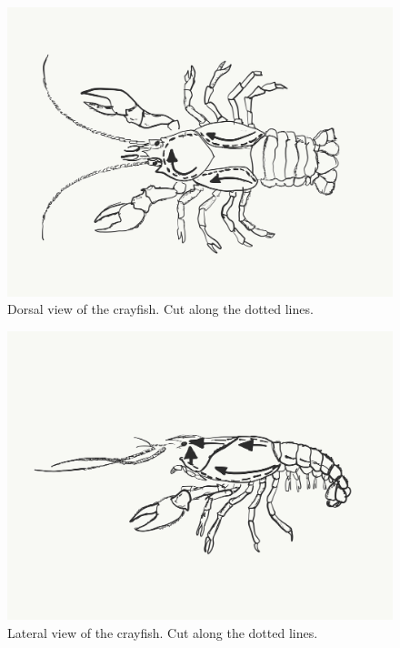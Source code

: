 \begin{figure}

{\centering \includegraphics[width=0.7\linewidth]{./figures/nematoda/crayfish_dorsal}

}

\caption{Dorsal view of the crayfish. Cut along the dotted lines.}\label{fig:dorsal}
\end{figure}

\begin{figure}

{\centering \includegraphics[width=0.7\linewidth]{./figures/nematoda/crayfish_lateral}

}

\caption{Lateral view of the crayfish. Cut along the dotted lines.}\label{fig:lateral}
\end{figure}

